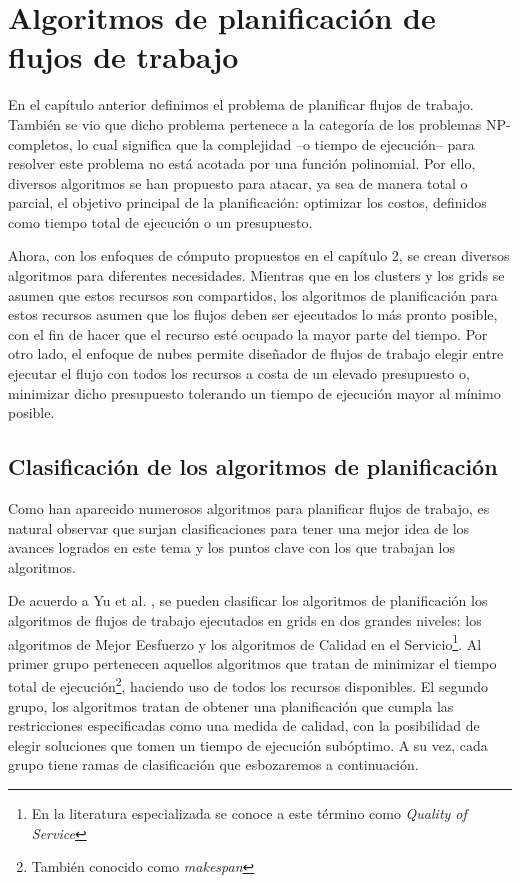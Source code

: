 \chapter{Algoritmos de planificación de flujos de trabajo}
En el capítulo anterior definimos el problema de planificar flujos de trabajo. También se vio que dicho problema pertenece a la categoría de los problemas NP-completos, lo cual significa que la complejidad --o tiempo de ejecución-- para resolver este problema no está acotada por una función polinomial. Por ello, diversos algoritmos se han propuesto para atacar, ya sea de manera total o parcial, el objetivo principal de la planificación: optimizar los costos, definidos como tiempo total de ejecución o un presupuesto.

Ahora, con los enfoques de cómputo propuestos en el capítulo 2, se crean diversos algoritmos para diferentes necesidades. Mientras que en los clusters y los grids se asumen que estos recursos son compartidos, los algoritmos de planificación para estos recursos asumen que los flujos deben ser ejecutados lo más pronto posible, con el fin de hacer que el recurso esté ocupado la mayor parte del tiempo. Por otro lado, el enfoque de nubes permite diseñador de flujos de trabajo elegir entre ejecutar el flujo con todos los recursos a costa de un elevado presupuesto o, minimizar dicho presupuesto tolerando un tiempo de ejecución mayor al mínimo posible.

\section{Clasificación de los algoritmos de planificación}
Como han aparecido numerosos algoritmos para planificar flujos de trabajo, es natural observar que surjan clasificaciones \cite{topcuoglu2002performance} \cite{yu2008workflow} para tener una mejor idea de los avances logrados en este tema y los puntos clave con los que trabajan los algoritmos.

De acuerdo a Yu et al. \cite{yu2008workflow}, se pueden clasificar los algoritmos de planificación los algoritmos de flujos de trabajo ejecutados en grids en dos grandes niveles: los algoritmos de Mejor Eesfuerzo y los algoritmos de Calidad en el Servicio\footnote{En la literatura especializada se conoce a este término como \emph{Quality of Service}}. Al primer grupo pertenecen aquellos algoritmos que tratan de minimizar el tiempo total de ejecución\footnote{También conocido como \emph{makespan}}, haciendo uso de todos los recursos disponibles. El segundo grupo, los algoritmos tratan de obtener una planificación que cumpla las restricciones especificadas como una medida de calidad, con la posibilidad de elegir soluciones que tomen un tiempo de ejecución subóptimo. A su vez, cada grupo tiene ramas de clasificación que esbozaremos a continuación.

